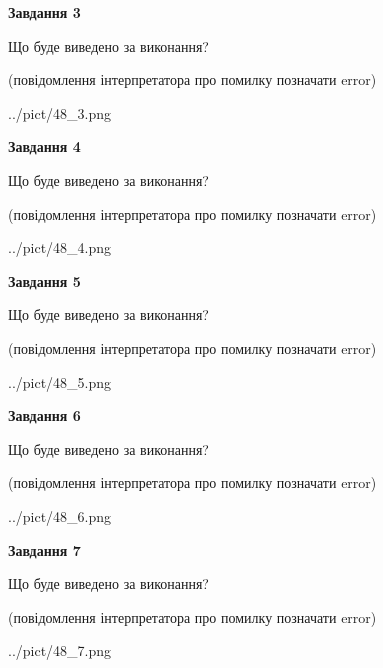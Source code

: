 \documentclass[12pt, ukrainian]{article}
\begin{document}
{\begin {large}
{\begin {center}\textbf{Завдання 3}\end {center}}\par
Що буде виведено за виконання?\par
 (повідомлення інтерпретатора про помилку позначати error)\par
\begin{center}
	{../pict/48_3.png}
\end{center}
\newpage

{\begin {center}\textbf{Завдання 4}\end {center}}\par
Що буде виведено за виконання?\par
 (повідомлення інтерпретатора про помилку позначати error)\par
\begin{center}
	{../pict/48_4.png}
\end{center}
\newpage

{\begin {center}\textbf{Завдання 5}\end {center}}\par
Що буде виведено за виконання?\par
 (повідомлення інтерпретатора про помилку позначати error)\par
\begin{center}
	{../pict/48_5.png}
\end{center}
\newpage

{\begin {center}\textbf{Завдання 6}\end {center}}\par
Що буде виведено за виконання?\par
 (повідомлення інтерпретатора про помилку позначати error)\par
\begin{center}
	{../pict/48_6.png}
\end{center}
\newpage

{\begin {center}\textbf{Завдання 7}\end {center}}\par
Що буде виведено за виконання?\par
 (повідомлення інтерпретатора про помилку позначати error)\par
\begin{center}
	{../pict/48_7.png}
\end{center}
\newpage


\end{large}}
\end{document}
